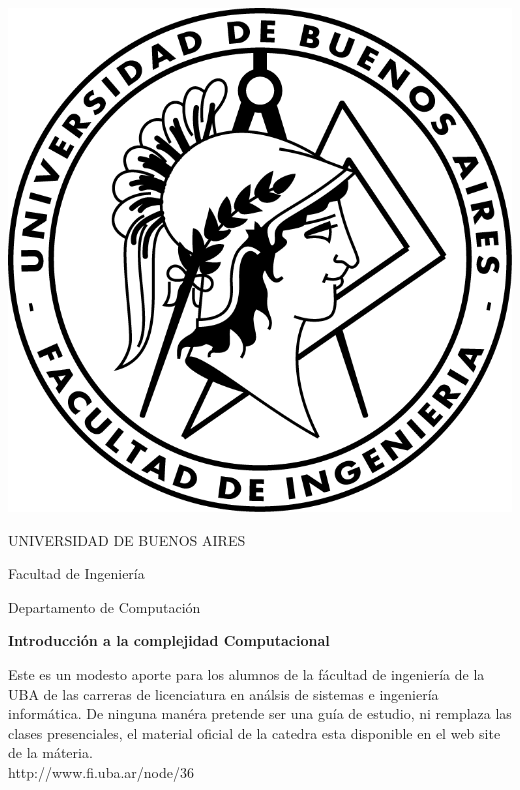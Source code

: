 \documentclass[12pt]{book}
\begin{document}
\thispagestyle{empty}

\begin {center}

\includegraphics[scale=.4]{Logo-fiuba_big.png}

\medskip
UNIVERSIDAD DE BUENOS AIRES

Facultad de Ingenier\'ia

Departamento de Computaci\'on


\vspace{3cm}


\textbf{\large Introducci\'on a la complejidad Computacional}

\vspace{2cm}


Este es un modesto aporte para los alumnos de la f\'acultad de ingenier\'ia  de la UBA de las carreras de licenciatura en an\'alsis de sistemas e ingenier\'ia inform\'atica.
De ninguna man\'era pretende ser una gu\'ia de estudio, ni remplaza las clases presenciales, el material oficial de la catedra esta disponible en el web site de la m\'ateria.
\\
http://www.fi.uba.ar/node/36

\end {center}


\vspace{2.5cm}
\end{document}
